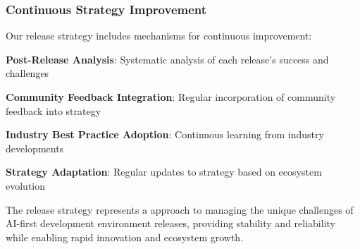 \subsubsection*{Continuous Strategy Improvement}

Our release strategy includes mechanisms for continuous improvement:

\begin{compactlist}
    \item \textbf{Post-Release Analysis}: Systematic analysis of each release's success and challenges
    \item \textbf{Community Feedback Integration}: Regular incorporation of community feedback into strategy
    \item \textbf{Industry Best Practice Adoption}: Continuous learning from industry developments
    \item \textbf{Strategy Adaptation}: Regular updates to strategy based on ecosystem evolution
\end{compactlist}

The release strategy represents a approach to managing the unique challenges of AI-first development environment releases, providing stability and reliability while enabling rapid innovation and ecosystem growth.
